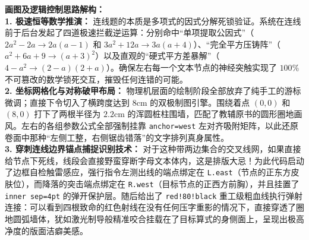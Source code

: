 \vspace{0.4cm}
{\small\color{blue!70!black}
\textbf{画图及逻辑控制思路解构：}\\
\textbf{1. 极速恒等数学推演：} 连线题的本质是多项式的因式分解死锁验证。系统在连线前于后台发起了四道极速拦截逆运算：分别命中“单项提取公因式”（$2a^2 - 2a \rightarrow 2a(a - 1)$ 和 $3a^2 + 12a \rightarrow 3a(a + 4)$）、“完全平方压铸阵”（$a^2 + 6a + 9 \rightarrow (a+3)^2$）以及直观的“硬式平方差暴解”（$4 - a^2 \rightarrow (2-a)(2+a)$）。确保左右每一个文本节点的神经突触实现了 $100\%$ 不可篡改的数学锁死交互，摧毁任何连错的可能。\\
\textbf{2. 坐标网格化与对称破甲布局：} 物理机层面的绘制阶段全部放弃了纯手工的游标微调；直接下令切入了横跨度达到 $8\mathrm{cm}$ 的双极制图引擎。围绕着点 $(0,0)$ 和 $(8,0)$ 打下了两根半径为 $2.2\mathrm{cm}$ 的浑圆桩柱围墙，匹配了教辅原书的圆形圈地画风。左右的各组参数公式全部强制挂靠 \texttt{anchor=west} 左对齐吸附矩阵，以此还原卷面中那种“左侧工整，右侧锯齿错落”的文字排列真身属性。\\
\textbf{3. 穿刺连线边界锚点捕捉识别技术：} 对于这种带两边集合的交叉线网，如果直接给节点下死线，线段会直接野蛮穿断字母文本体内，这是排版大忌！为此代码启动了边框自检触雷感应，强行指令左测出线的端点绑定在 \texttt{L.east}（节点的正东方皮肤位），而降落的突击端点绑定在 \texttt{R.west}（目标节点的正西方前胸），并且挂置了 \texttt{inner sep=4pt} 的弹开保护层。随后给出了 \texttt{red!80!black} 重工级粗血线执行弹射连接：可以看到四根致命的红色射线在没有任何压字重影的情况下，直接穿透了圈地圆弧墙体，犹如激光制导般精准咬合挂载在了目标算式的身侧面上，呈现出极高净度的版面洁癖美感。
}
\newpage


